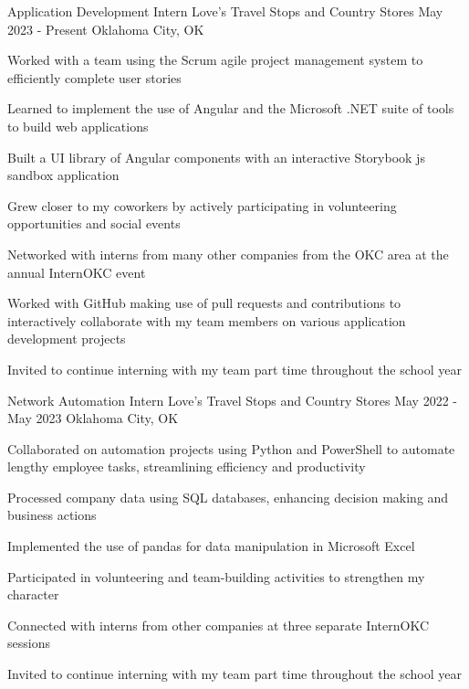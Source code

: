 \documentclass[letterpaper]{resumeconfig}
\begin{document}
\WorkExperience
    {Application Development Intern} %
    {Love's Travel Stops and Country Stores} %
    {May 2023 - Present} %
    {Oklahoma City, OK} %
    {
        \item Worked with a team using the Scrum agile project management system to efficiently complete user stories
        \item Learned to implement the use of Angular and the Microsoft .NET suite of tools to build web applications
        \item Built a UI library of Angular components with an interactive Storybook js sandbox application
        \item Grew closer to my coworkers by actively participating in volunteering opportunities and social events
        \item Networked with interns from many other companies from the OKC area at the annual InternOKC event
        \item Worked with GitHub making use of pull requests and contributions to interactively collaborate with my team members on various application development projects
        \item Invited to continue interning with my team part time throughout the school year
    }
    \vspace{1em}

\WorkExperience
    {Network Automation Intern} %
    {Love's Travel Stops and Country Stores} %
    {May 2022 - May 2023} %
    {Oklahoma City, OK} %
    {
        \item Collaborated on automation projects using Python and PowerShell to automate lengthy employee tasks, streamlining efficiency and productivity
        \item Processed company data using SQL databases, enhancing decision making and business actions
        \item Implemented the use of pandas for data manipulation in Microsoft Excel
        \item Participated in volunteering and team-building activities to strengthen my character
        \item Connected with interns from other companies at three separate InternOKC sessions
        \item Invited to continue interning with my team part time throughout the school year
    }
    
\end{document}
